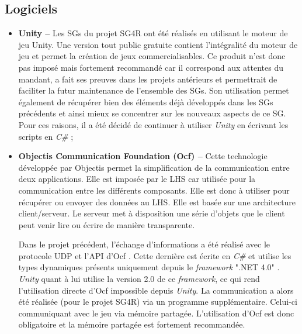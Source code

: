 		\subsection*{Logiciels} 	
			\begin{itemize}
				\item \textbf{Unity \cite{Unity_website} --} Les SGs du projet SG4R ont été réalisés en utilisant le moteur de jeu Unity. Une version tout public gratuite contient l'intégralité du moteur de jeu et permet la création de jeux commercialisables. Ce produit n'est donc pas imposé mais fortement recommandé car il correspond aux attentes du mandant, a fait ses preuves dans les projets antérieurs et permettrait de faciliter la futur maintenance de l'ensemble des SGs. Son utilisation permet également de récupérer bien des éléments déjà développés dans les SGs précédents et ainsi mieux se concentrer sur les nouveaux aspects de ce SG. Pour ces raisons, il a été décidé de continuer à utiliser \textit{Unity} en écrivant les scripts en\textit{ C\#} \cite{CSharp_website};
				
				\item \textbf{Objectis Communication Foundation (Ocf) \cite{OcfClient_website} --} Cette technologie développée par Objectis \cite{Objectis_website} permet la simplification de la communication entre deux applications. Elle est imposée par le LHS car utilisée pour la communication entre les différents composants. Elle est donc à utiliser pour récupérer ou envoyer des données au LHS. Elle est basée sur une architecture client/serveur. Le serveur met à disposition une série d'objets que le client peut venir lire ou écrire de manière transparente.
				
				Dans le projet précédent, l'échange d'informations a été réalisé avec le protocole UDP et l'API d'Ocf \cite{OcfClient_website}. Cette dernière est écrite en \textit{C\#} \cite{CSharp_website} et utilise les types dynamiques présents uniquement depuis le \textit{framework} ".NET 4.0" \cite{DotNetFramework_website}.
				\textit{Unity} quant à lui utilise la version 2.0 de ce \textit{framework}, ce qui rend l'utilisation directe d'Ocf impossible depuis \textit{Unity}. La communication a alors été réalisée (pour le projet SG4R) via un programme supplémentaire. Celui-ci communiquant avec le jeu via mémoire partagée. L'utilisation d'Ocf est donc obligatoire et la mémoire partagée est fortement recommandée.
			\end{itemize}		
		
